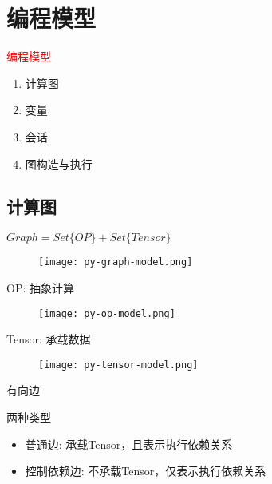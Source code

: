 \section{编程模型}
\label{sec:prog-model}

\begin{frame}
  \begin{center}
    \Huge{\textcolor{red}{编程模型}}
  \end{center}

  \begin{enumerate}
    \item \alert{计算图}
    \item \alert{变量}
    \item \alert{会话}
    \item \alert{图构造与执行}    
  \end{enumerate}     
\end{frame}

\subsection{计算图}

\begin{frame}{$ Graph = Set\{OP\} + Set\{Tensor\} $}
  \begin{figure}
    \centering
    \texttt{[image: py-graph-model.png]}
  \end{figure}
\end{frame}

\begin{frame}{OP: 抽象计算}
  \begin{figure}
    \centering
    \texttt{[image: py-op-model.png]}
  \end{figure}
\end{frame}

\begin{frame}{Tensor: 承载数据}
  \begin{figure}
    \centering
    \texttt{[image: py-tensor-model.png]}
  \end{figure}
\end{frame}

\begin{frame}{有向边}
  \begin{block}{两种类型}
    \begin{itemize}
      \item \alert{普通边}: 承载Tensor，且表示执行依赖关系
      \item \alert{控制依赖边}: 不承载Tensor，仅表示执行依赖关系  
    \end{itemize}
  \end{block}
\end{frame}

